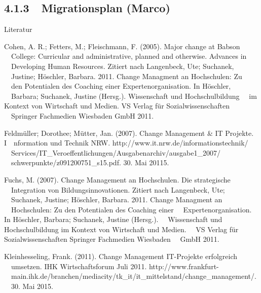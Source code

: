 \documentclass{article}
\begin{document}
\subsection{}
\clearpage\subsection[4.1.3\ \ Migrationsplan (Marco)]{4.1.3\ \ Migrationsplan (Marco)}

\bigskip


\bigskip


\bigskip


\bigskip


\bigskip


\bigskip

Literatur


\bigskip

Cohen, A. R.; Fetters, M.; Fleischmann, F. (2005). Major change at Babson \ \ College: Curricular and administrative,
planned and otherwise. Advances in \ \ Developing Human Resources. Zitiert nach Langenbeck, Ute; Suchanek, \ \ Justine;
Höschler, Barbara. 2011. Change Managment an Hochschulen: Zu \ \ den Potentialen des Coaching einer
Expertenorganisation. In Höschler, \ \ Barbara; Suchanek, Justine (Hersg.). Wissenschaft und Hochschulbildung \ \ im
Kontext von Wirtschaft und Medien. VS Verlag f\"{u}r Sozialwissenschaften \ \ Springer Fachmedien Wiesbaden GmbH 2011.


\bigskip

Feldmüller; Dorothee; Mütter, Jan. (2007). Change Management \& IT Projekte. I\ \ nformation und Technik NRW.
http://www.it.nrw.de/informationstechnik/ \ \ Services/IT\_Veroeffentlichungen/Ausgabenarchiv/ausgabe1\_2007/
\ \ schwerpunkte/z091200751\_s15.pdf. 30. Mai 20115.


\bigskip

Fuchs, M. (2007). Change Management an Hochschulen. Die strategische \ \ Integration von Bildungsinnovationen. Zitiert
nach Langenbeck, Ute; \ \ Suchanek, Justine; Höschler, Barbara. 2011. Change Managment an \ \ Hochschulen: Zu den
Potentialen des Coaching einer \ \ Expertenorganisation. In Höschler, Barbara; Suchanek, Justine (Hersg.).
\ \ Wissenschaft und Hochschulbildung im Kontext von Wirtschaft und Medien. \ \ VS Verlag f\"{u}r Sozialwissenschaften
Springer Fachmedien Wiesbaden \ \ GmbH 2011.


\bigskip

Kleinhesseling, Frank. (2011). Change Management IT-Projekte erfolgreich \ \ umsetzen. IHK Wirtschaftsforum Juli 2011.
http://www.frankfurt-\ \ main.ihk.de/branchen/mediacity/tk\_it/it\_mittelstand/change\_management/. \ \ 30. Mai 2015. 
\end{document}
